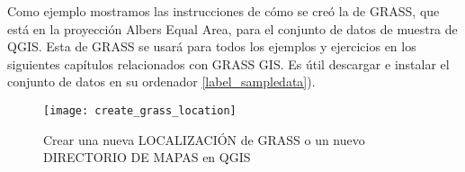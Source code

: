 Como ejemplo mostramos las instrucciones de cómo se creó la  de GRASS,
que está en la proyección Albers Equal Area, para el conjunto de datos de muestra de QGIS. Esta
 de GRASS se usará para todos los ejemplos y ejercicios en los siguientes capítulos
relacionados con GRASS GIS. Es útil descargar e instalar el conjunto de datos en su ordenador \ref{label_sampledata}).

\begin{figure}[ht]
\begin{center}
\caption{Crear una nueva LOCALIZACIÓN de GRASS o un nuevo DIRECTORIO DE MAPAS en QGIS \nixcaption}
\label{fig:create_grass_location}\smallskip
\texttt{[image: create\_grass\_location]}
\end{center}  
\end{figure}

